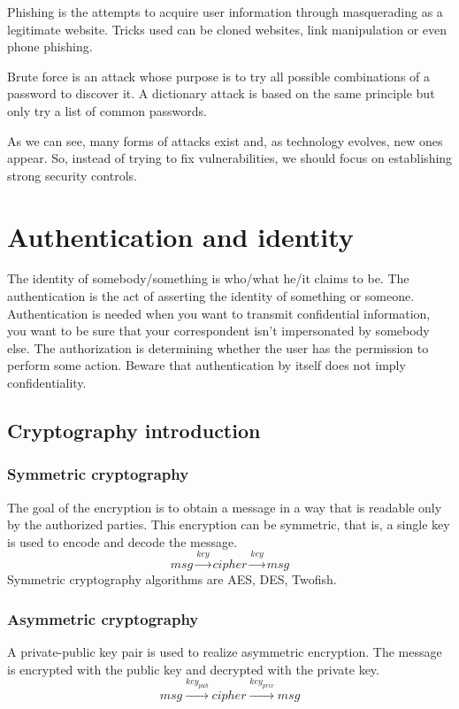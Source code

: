 Phishing is the attempts to acquire user information through masquerading as a
legitimate website. Tricks used can be cloned websites, link manipulation or
even phone phishing.

Brute force is an attack whose purpose is to try all possible combinations of
a password to discover it. A dictionary attack is based on the same principle
but only try a list of common passwords.

As we can see, many forms of attacks exist and, as technology evolves, new
ones appear. So, instead of trying to fix vulnerabilities, we should focus on
establishing strong security controls.

\section{Authentication and identity}

The identity of somebody/something is who/what he/it claims to be.
The authentication is the act of asserting the identity of something or someone.
Authentication is needed when you want to transmit confidential
information, you want to be sure that your correspondent isn't
impersonated by somebody else.
The authorization is determining whether the user has the permission to perform some action.
Beware that authentication by itself does not imply confidentiality.

\subsection{Cryptography introduction}

\subsubsection{Symmetric cryptography}
The goal of the encryption is to obtain a message in a way that is readable
only by the authorized parties.
This encryption can be symmetric, that is, a single key is used to encode and
decode the message.
\[ msg \xrightarrow{key} cipher \xrightarrow{key} msg \]
Symmetric cryptography algorithms are AES, DES, Twofish.

\subsubsection{Asymmetric cryptography}
A private-public key pair is used to realize asymmetric encryption. The
message is encrypted with the public key and decrypted with the private key.
\[ msg \xrightarrow{key_{pub}} cipher \xrightarrow{key_{priv}} msg \]

